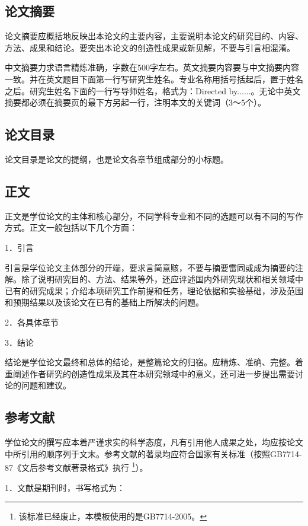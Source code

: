 \documentclass[a4paper,12pt,oneside,openany]{book}
\begin{document}
\subsection{论文摘要}

论文摘要应概括地反映出本论文的主要内容，主要说明本论文的研究目的、内容、方法、成果和结论。要突出本论文的创造性成果或新见解，不要与引言相混淆。

中文摘要力求语言精炼准确，字数在500字左右。英文摘要内容要与中文摘要内容一致。并在英文题目下面第一行写研究生姓名。专业名称用括号括起后，置于姓名之后。研究生姓名下面的一行写导师姓名，格式为：Directed
by......。无论中英文摘要都必须在摘要页的最下方另起一行，注明本文的关键词（3～5个）。


\subsection{论文目录}

论文目录是论文的提纲，也是论文各章节组成部分的小标题。


\subsection{正文}

正文是学位论文的主体和核心部分，不同学科专业和不同的选题可以有不同的写作方式。正文一般包括以下几个方面：

1．引言

引言是学位论文主体部分的开端，要求言简意赅，不要与摘要雷同或成为摘要的注解。除了说明研究目的、方法、结果等外，还应评述国内外研究现状和相关领域中已有的研究成果；介绍本项研究工作前提和任务，理论依据和实验基础，涉及范围和预期结果以及该论文在已有的基础上所解决的问题。

2．各具体章节

3．结论

结论是学位论文最终和总体的结论，是整篇论文的归宿。应精炼、准确、完整。着重阐述作者研究的创造性成果及其在本研究领域中的意义，还可进一步提出需要讨论的问题和建议。


\subsection{参考文献}

学位论文的撰写应本着严谨求实的科学态度，凡有引用他人成果之处，均应按论文中所引用的顺序列于文末。参考文献的著录均应符合国家有关标准（按照GB7714-87《文后参考文献著录格式》执行%
\footnote{该标准已经废止，本模板使用的是GB7714-2005。%
}）。

1．文献是期刊时，书写格式为：
\end{document}
